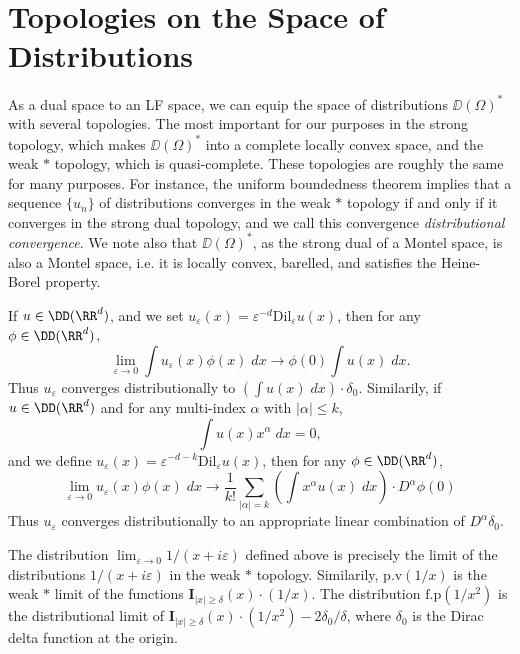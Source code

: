 \section{Topologies on the Space of Distributions}

As a dual space to an LF space, we can equip the space of distributions $\DD(\Omega)^*$ with several topologies. The most important for our purposes in the strong topology, which makes $\DD(\Omega)^*$ into a complete locally convex space, and the weak $*$ topology, which is quasi-complete. These topologies are roughly the same for many purposes. For instance, the uniform boundedness theorem implies that a sequence $\{ u_n \}$ of distributions converges in the weak $*$ topology if and only if it converges in the strong dual topology, and we call this convergence \emph{distributional convergence}. We note also that $\DD(\Omega)^*$, as the strong dual of a Montel space, is also a Montel space, i.e. it is locally convex, barelled, and satisfies the Heine-Borel property.

\begin{example}
    If $u \in \DD(\RR^d)$, and we set $u_\varepsilon(x) = \varepsilon^{-d} \text{Dil}_\varepsilon u(x)$, then for any $\phi \in \DD(\RR^d)$,
    \[ \lim_{\varepsilon \to 0} \int u_\varepsilon(x) \phi(x)\; dx \to \phi(0) \int u(x)\; dx. \]
    Thus $u_\varepsilon$ converges distributionally to $(\int u(x)\; dx) \cdot \delta_0$. Similarily, if $u \in \DD(\RR^d)$ and for any multi-index $\alpha$ with $|\alpha| \leq k$,
    \[ \int u(x) x^\alpha\; dx = 0, \]
    and we define $u_\varepsilon(x) = \varepsilon^{-d-k} \text{Dil}_\varepsilon u(x)$, then for any $\phi \in \DD(\RR^d)$,
    \[ \lim_{\varepsilon \to 0} u_\varepsilon(x) \phi(x)\; dx \to \frac{1}{k!} \sum_{|\alpha| = k} \left( \int x^\alpha u(x)\; dx \right) \cdot D^\alpha \phi(0) \]
    Thus $u_\varepsilon$ converges distributionally to an appropriate linear combination of $D^\alpha \delta_0$.
\end{example}

\begin{example}
    The distribution $\lim_{\varepsilon \to 0} 1/(x + i\varepsilon)$ defined above is precisely the limit of the distributions $1/(x + i \varepsilon)$ in the weak $*$ topology. Similarily, $\text{p.v}(1/x)$ is the weak $*$ limit of the functions $\mathbf{I}_{|x| \geq \delta}(x) \cdot (1/x)$. The distribution $\text{f.p}(1/x^2)$ is the distributional limit of $\mathbf{I}_{|x| \geq \delta}(x) \cdot (1/x^2) - 2 \delta_0 / \delta$, where $\delta_0$ is the Dirac delta function at the origin.
\end{example}

